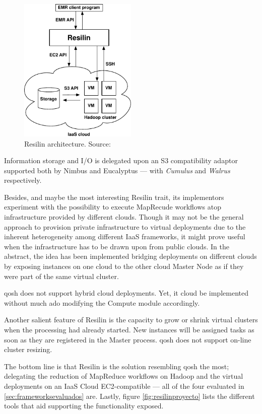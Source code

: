 \begin{figure}[tbp]
\begin{center}
\includegraphics[width=0.5\textwidth]{imagenes/035.pdf}
 \caption{Resilin architecture. Source: \cite{resilin}}
\label{fig:arquitecturaresilin}
\end{center}
\end{figure}

Information storage and I/O is delegated upon an S3 compatibility adaptor supported both by Nimbus and Eucalyptus --- with \emph{Cumulus} and \emph{Walrus} respectively.

Besides, and maybe the most interesting Resilin trait, its implementors experiment with the possibility to execute MapRecude workflows atop infrastructure provided by different clouds. Though it may not be the general approach to provision private infrastructure to virtual deployments due to the inherent heterogeneity among different IaaS frameworks, it might prove useful when the infrastructure has to be drawn upon from public clouds. In the abstract, the idea has been implemented bridging deployments on different clouds by exposing instances on one cloud to the other cloud Master Node as if they were part of the same virtual cluster.

qosh does not support hybrid cloud deployments. Yet, it cloud be implemented without much ado modifying the Compute module accordingly.

Another salient feature of Resilin is the capacity to grow or shrink virtual clusters when the processing had already started. New instances will be assigned tasks as soon as they are registered in the Master process. qosh does not support on-line cluster resizing.

The bottom line is that Resilin is the solution resembling qosh the most; delegating the reduction of MapReduce workflows on Hadoop and the virtual deployments on an IaaS Cloud EC2-compatible --- all of the four evaluated in \ref{sec:frameworksevaluados} are. Lastly, figure \ref{fig:resilinproyecto} lists the different tools that aid supporting the functionality exposed.

